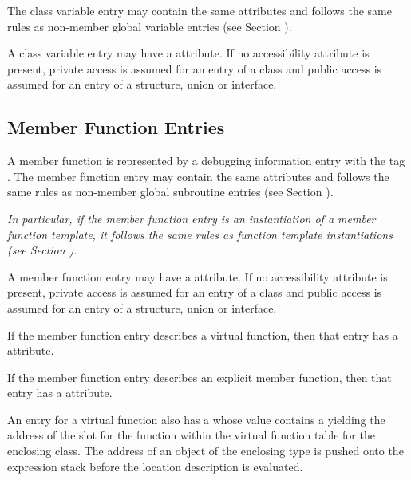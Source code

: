 {The class variable entry
may contain the same attributes and follows the same rules
as non-member global variable entries
(see Section ).

A class variable entry may have a
\hyperlink{chap:DWATaccessibilityattribute}{\DWATaccessibilityNAME}
attribute. If no accessibility attribute is present, private
access is assumed for an entry of a class and public access
is assumed for an entry of a structure, union or interface.

\subsection{Member Function Entries}
\label{chap:memberfunctionentries}

A member function is represented by a 
debugging information entry 
with the 
tag \DWTAGsubprogram.
The member function entry
may contain the same attributes and follows the same rules
as non-member global subroutine entries 
(see Section ).

\textit{In particular, if the member function entry is an
instantiation of a member function template, it follows the 
same rules as function template instantiations (see Section 
).
}

A member function entry may have a 
\hyperlink{chap:DWATaccessibilityattribute}{\DWATaccessibilityNAME}
attribute. If no accessibility attribute is present, private
access is assumed for an entry of a class and public access
is assumed for an entry of a structure, union or interface.

If the member function entry describes a virtual function,
then that entry has a
\hyperlink{chap:DWATvirtualityvirtualityindication}{\DWATvirtualityNAME} 
attribute.

If\hypertarget{chap:DWATexplicitexplicitpropertyofmemberfunction}{}
the member function entry describes an explicit member
function, then that entry has a
\DWATexplicitDEFN{} attribute.

An\hypertarget{chap:DWATvtableelemlocationvirtualfunctiontablevtableslot}{}
entry for a virtual function also has a
\DWATvtableelemlocationDEFN{}
 whose value contains
a  
yielding the address of the slot
for the function within the virtual function table for the
enclosing class. The address of an object of the enclosing
type is pushed onto the expression stack before the location
description is evaluated.

}
